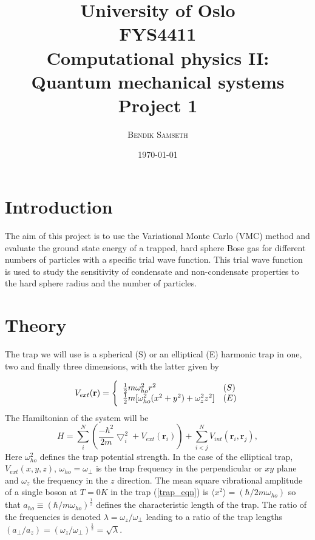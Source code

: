 \documentclass[twocolumn]{article}
\title{ \small
University of Oslo\\
FYS4411\\
Computational physics II: Quantum mechanical systems\\
\huge Project 1 }
\author{\textsc{Bendik Samseth}}
\date{\today}
\begin{document}
\maketitle


\section{Introduction}
The aim of this project is to use the Variational Monte Carlo
(VMC) method and evaluate the ground state energy of a trapped, hard
sphere Bose gas for different numbers of particles with a specific
trial wave function. This trial wave function is used to study the sensitivity of
condensate and non-condensate properties to the hard sphere radius
and the number of particles.  

\section{Theory}
The trap we will use is a spherical (S)
or an elliptical (E) harmonic trap in one, two and finally three
dimensions, with the latter given by

\begin{equation}
    V_{ext}(\mathbf{r}) = 
    \Bigg\{
        \begin{array}{ll}
            \frac{1}{2}m\omega_{ho}^2r^2 & (S)\\
            \strut
            \frac{1}{2}m[\omega_{ho}^2(x^2+y^2) + \omega_z^2z^2] & (E)
            \label{trap_eqn}
        \end{array}
\end{equation}
The Hamiltonian of the system will be
\begin{equation}
    H = \sum_i^N \left(\frac{-\hbar^2}{2m}{\bigtriangledown }_{i}^2 +V_{ext}({\mathbf{r}}_i)\right)  +
     \sum_{i<j}^{N} V_{int}({\mathbf{r}}_i,{\mathbf{r}}_j),
\end{equation}
Here $\omega_{ho}^2$ defines the trap potential strength.  In the case of the
elliptical trap, $V_{ext}(x,y,z)$, $\omega_{ho}=\omega_{\perp}$ is the trap
frequency in the perpendicular or $xy$ plane and $\omega_z$ the frequency in
the $z$ direction.  The mean square vibrational amplitude of a single boson at
$T=0K$ in the trap (\ref{trap_eqn}) is $\langle
x^2\rangle=(\hbar/2m\omega_{ho})$ so that $a_{ho} \equiv
(\hbar/m\omega_{ho})^{\frac{1}{2}}$ defines the characteristic length of the
trap.  The ratio of the frequencies is denoted
$\lambda=\omega_z/\omega_{\perp}$ leading to a ratio of the trap lengths
$(a_{\perp}/a_z)=(\omega_z/\omega_{\perp})^{\frac{1}{2}} = \sqrt{\lambda}$.
\end{document}
